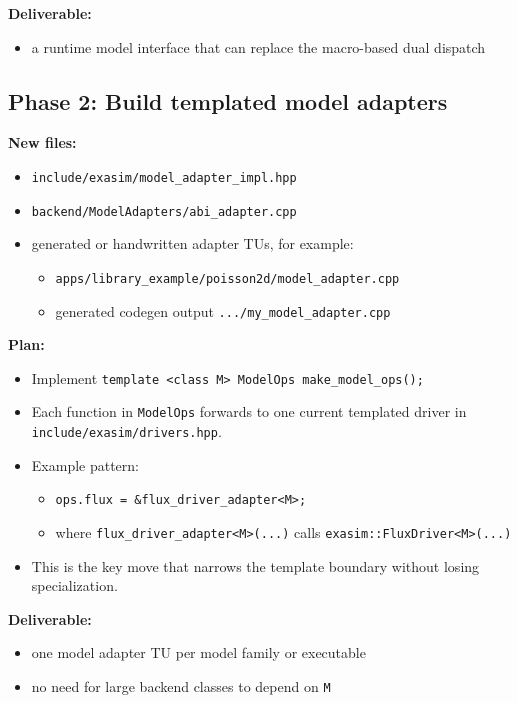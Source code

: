 \documentclass[11pt]{article}
\begin{document}
\textbf{Deliverable:}
\begin{itemize}[leftmargin=*]
\item a runtime model interface that can replace the macro-based dual dispatch
\end{itemize}

\subsection*{Phase 2: Build templated model adapters}

\textbf{New files:}
\begin{itemize}[leftmargin=*]
\item \texttt{include/exasim/model\_adapter\_impl.hpp}
\item \texttt{backend/ModelAdapters/abi\_adapter.cpp}
\item generated or handwritten adapter TUs, for example:
\begin{itemize}[leftmargin=*]
\item \texttt{apps/library\_example/poisson2d/model\_adapter.cpp}
\item generated codegen output \texttt{.../my\_model\_adapter.cpp}
\end{itemize}
\end{itemize}

\textbf{Plan:}
\begin{itemize}[leftmargin=*]
\item Implement \texttt{template <class M> ModelOps make\_model\_ops();}
\item Each function in \texttt{ModelOps} forwards to one current templated driver in \texttt{include/exasim/drivers.hpp}.
\item Example pattern:
\begin{itemize}[leftmargin=*]
\item \texttt{ops.flux = \&flux\_driver\_adapter<M>;}
\item where \texttt{flux\_driver\_adapter<M>(...)} calls \texttt{exasim::FluxDriver<M>(...)}
\end{itemize}
\item This is the key move that narrows the template boundary without losing specialization.
\end{itemize}

\textbf{Deliverable:}
\begin{itemize}[leftmargin=*]
\item one model adapter TU per model family or executable
\item no need for large backend classes to depend on \texttt{M}
\end{itemize}
\end{document}
